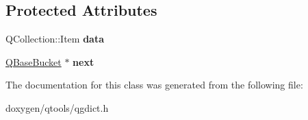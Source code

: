 \subsection*{Protected Attributes}
\begin{DoxyCompactItemize}
\item 
\mbox{\label{class_q_base_bucket_a3229a7c5fbfb6b1c40953baff31738d6}} 
Q\+Collection\+::\+Item {\bfseries data}
\item 
\mbox{\label{class_q_base_bucket_aa22295c39082152c6cee807a9e19992e}} 
\mbox{\hyperlink{class_q_base_bucket}{Q\+Base\+Bucket}} $\ast$ {\bfseries next}
\end{DoxyCompactItemize}


The documentation for this class was generated from the following file\+:\begin{DoxyCompactItemize}
\item 
doxygen/qtools/qgdict.\+h\end{DoxyCompactItemize}
